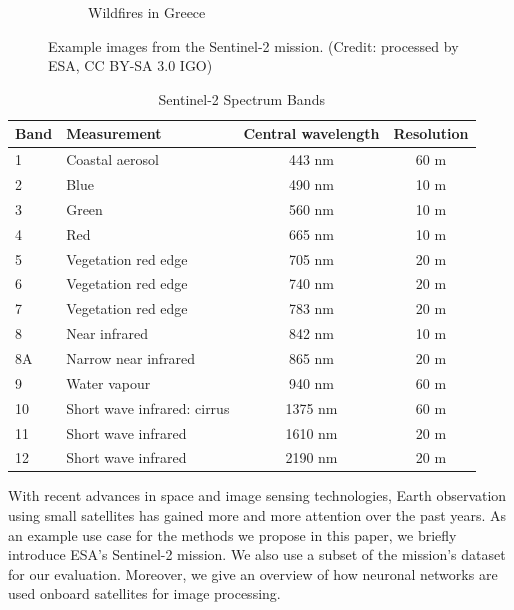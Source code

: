 \documentclass[conference]{IEEEtran}
\newcommand\sentinelii{Sentinel-2\xspace}
\begin{document}
\begin{figure}
\begin{subfigure}{.32\linewidth}
    \caption{Wildfires in Greece}
    \label{fig:sentinel_greece}
  \end{subfigure}

  \caption{Example images from the \sentinelii mission. (Credit: processed by ESA, CC BY-SA 3.0 IGO)}
  \label{fig:sentinelii}
\end{figure}

\begin{table}
  \caption{\sentinelii Spectrum Bands}
  \label{tab:sentinel_bands}

  \centering
  \begin{tabular}{llcc}
    \toprule
    Band & Measurement & Central wavelength & Resolution \\
    \midrule
    1 & Coastal aerosol & 443 nm & 60 m \\
    2 & Blue & 490 nm & 10 m \\
    3 & Green & 560 nm & 10 m \\
    4 & Red & 665 nm & 10 m \\
    5 & Vegetation red edge & 705 nm & 20 m \\
    6 & Vegetation red edge & 740 nm & 20 m \\
    7 & Vegetation red edge & 783 nm & 20 m \\
    8 & Near infrared & 842 nm & 10 m \\
    8A & Narrow near infrared & 865 nm & 20 m \\
    9 & Water vapour & 940 nm & 60 m \\
    10 & Short wave infrared: cirrus & 1375 nm & 60 m \\
    11 & Short wave infrared & 1610 nm & 20 m \\
    12 & Short wave infrared & 2190 nm & 20 m \\
    \bottomrule
  \end{tabular}
  
\end{table}

With recent advances in space and image sensing technologies, Earth observation using small satellites has gained more and more attention over the past years.
As an example use case for the methods we propose in this paper, we briefly introduce ESA's \sentinelii mission.
We also use a subset of the mission's dataset for our evaluation.
Moreover, we give an overview of how neuronal networks are used onboard satellites for image processing.
\end{document}
